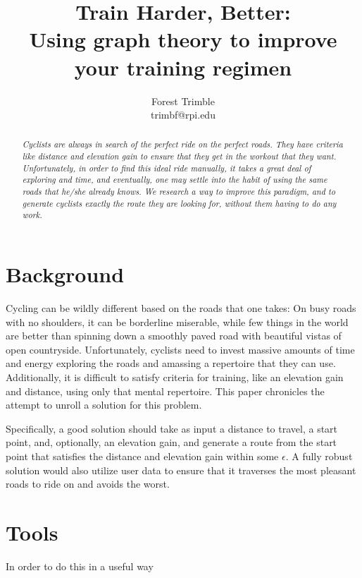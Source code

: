 \documentclass[twocolumn,11pt]{article}
\title{Train Harder, Better:\\Using graph theory to improve your
  training regimen}
\author{Forest Trimble\\trimbf@rpi.edu}
\begin{document}
\pagestyle{fancy}
\fancyhead{}
\maketitle

\begin{abstract}
  \emph{Cyclists are always in search of the perfect ride on the perfect
  roads. They have criteria like distance and elevation gain to ensure
  that they get in the workout that they want. Unfortunately, in order to
  find this ideal ride manually, it takes a great deal of exploring and
  time, and eventually, one may settle into the habit of using the same
  roads that he/she already knows. We research a way to improve this
  paradigm, and to generate cyclists exactly the route they are looking
  for, without them having to do any work.}
\end{abstract}

\section{Background}

Cycling can be wildly different based on the roads that one takes: On busy
roads with no shoulders, it can be borderline miserable, while few things in
the world are better than spinning down a smoothly paved road with beautiful
vistas of open countryside. Unfortunately, cyclists need to invest massive
amounts of time and energy exploring the roads and amassing a repertoire that
they can use. Additionally, it is difficult to satisfy criteria for training,
like an elevation gain and distance, using only that mental repertoire. This
paper chronicles the attempt to unroll a solution for this problem.

Specifically, a good solution should take as input a distance to travel, a
start point, and, optionally, an elevation gain, and generate a route from the
start point that satisfies the distance and elevation gain within some
$\epsilon$. A fully robust solution would also utilize user data to ensure that
it traverses the most pleasant roads to ride on and avoids the worst.

\section{Tools}

In order to do this in a useful way
\end{document}
